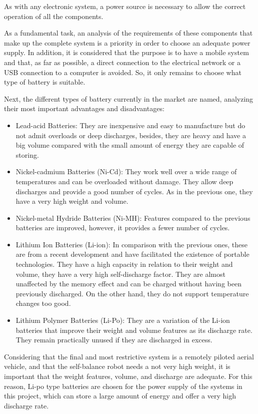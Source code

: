 As with any electronic system, a power source is necessary to allow the correct operation of all the components. \newline

As a fundamental task, an analysis of the requirements of these components that make up the complete system is a priority in order to choose an adequate power supply. In addition, it is considered that the purpose is to have a mobile system and that, as far as possible, a direct connection to the electrical network or a USB connection to a computer is avoided. So, it only remains to choose what type of battery is suitable.\newline

Next, the different types of battery currently in the market are named, analyzing their most important advantages and disadvantages: 

\begin{itemize}
	\item Lead-acid Batteries: They are inexpensive and easy to manufacture but do not admit overloads or deep discharges, besides, they are heavy and have a big volume compared with the small amount of energy they are capable of storing.
	\item Nickel-cadmium Batteries (Ni-Cd): They work well over a wide range of temperatures and can be overloaded without damage. They allow deep discharges and provide a good number of cycles. As in the previous one, they have a very high weight and volume.
	\item Nickel-metal Hydride Batteries (Ni-MH): Features compared to the previous batteries are improved, however, it provides a fewer number of cycles.
	\item Lithium Ion Batteries (Li-ion): In comparison with the previous ones, these are from a recent development and have facilitated the existence of portable technologies. They have a high capacity in relation to their weight and volume, they have a very high self-discharge factor. They are almost unaffected by the
	memory effect and can be charged without having been previously discharged. On the other hand, they do not support temperature changes too good.
	\item Lithium Polymer Batteries (Li-Po): They are a variation of the Li-ion batteries that improve their weight and volume features as its discharge rate. They remain practically unused if they are discharged in excess.
\end{itemize}

Considering that the final and most restrictive system is a remotely piloted aerial vehicle, and that the self-balance robot needs a not very high weight, it is important that the weight features, volume, and discharge are adequate. For this reason, Li-po type batteries are chosen for the power supply of the systems in this project, which can store a large amount of energy and offer a very high discharge rate. \newline

